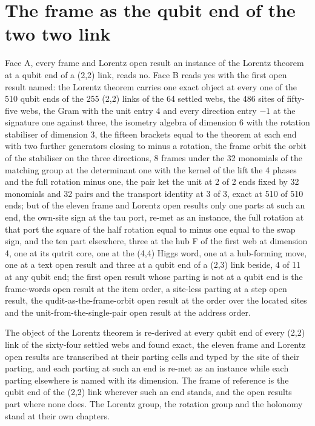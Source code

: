 \section{The frame as the qubit end of the two two link}\label{mod:X-11-frame-as-the-qubit-end-of-the-two-two-link}
\begin{chwall}\label{box:X-11-frame-as-the-qubit-end-of-the-two-two-link:1}
Face A, every frame and Lorentz open result an instance of the Lorentz theorem at a qubit end of a (2,2) link, reads no. Face B reads yes with the first open result named: the Lorentz theorem carries one exact object at every one of the 510 qubit ends of the 255 (2,2) links of the 64 settled webs, the 486 sites of fifty-five webs, the Gram with the unit entry 4 and every direction entry $-1$ at the signature one against three, the isometry algebra of dimension 6 with the rotation stabiliser of dimension 3, the fifteen brackets equal to the theorem at each end with two further generators closing to minus a rotation, the frame orbit the orbit of the stabiliser on the three directions, 8 frames under the 32 monomials of the matching group at the determinant one with the kernel of the lift the 4 phases and the full rotation minus one, the pair ket the unit at 2 of 2 ends fixed by 32 monomials and 32 pairs and the transport identity at 3 of 3, exact at 510 of 510 ends; but of the eleven frame and Lorentz open results only one parts at such an end, the own-site sign at the tau port, re-met as an instance, the full rotation at that port the square of the half rotation equal to minus one equal to the swap sign, and the ten part elsewhere, three at the hub F of the first web at dimension 4, one at its qutrit core, one at the (4,4) Higgs word, one at a hub-forming move, one at a text open result and three at a qubit end of a (2,3) link beside, 4 of 11 at any qubit end; the first open result whose parting is not at a qubit end is the frame-words open result at the item order, a site-less parting at a step open result, the qudit-as-the-frame-orbit open result at the order over the located sites and the unit-from-the-single-pair open result at the address order.
\end{chwall}
The object of the Lorentz theorem is re-derived at every qubit end of every (2,2) link of the sixty-four settled webs and found exact, the eleven frame and Lorentz open results are transcribed at their parting cells and typed by the site of their parting, and each parting at such an end is re-met as an instance while each parting elsewhere is named with its dimension. The frame of reference is the qubit end of the (2,2) link wherever such an end stands, and the open results part where none does. The Lorentz group, the rotation group and the holonomy stand at their own chapters.

